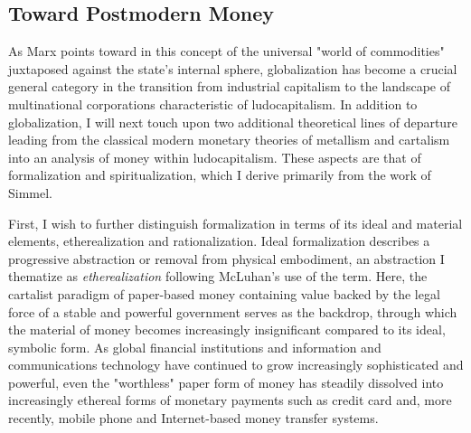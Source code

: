 \subsection*{Toward Postmodern Money}
As Marx points toward in this concept of the universal "world of commodities" juxtaposed against the state's internal sphere, globalization has become a crucial general category in the transition from industrial capitalism to the landscape of multinational corporations characteristic of ludocapitalism. In addition to globalization, I will next touch upon two additional theoretical lines of departure leading from the classical modern monetary theories of metallism and cartalism into an analysis of money within ludocapitalism. These aspects are that of formalization and spiritualization, which I derive primarily from the work of Simmel.

First, I wish to further distinguish formalization in terms of its ideal and material elements, etherealization and rationalization. Ideal formalization describes a progressive abstraction or removal from physical embodiment, an abstraction I thematize as \emph{etherealization} following McLuhan's use of the term. Here, the cartalist paradigm of paper-based money containing value backed by the legal force of a stable and powerful government serves as the backdrop, through which the material of money becomes increasingly insignificant compared to its ideal, symbolic form. As global financial institutions and information and communications technology have continued to grow increasingly sophisticated and powerful, even the "worthless" paper form of money has steadily dissolved into increasingly ethereal forms of monetary payments such as credit card and, more recently, mobile phone and Internet-based money transfer systems.

